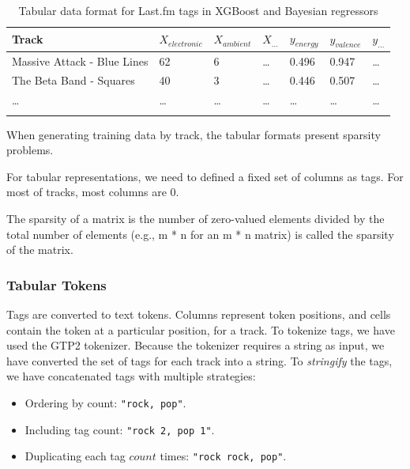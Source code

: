 \documentclass[sn-mathphys]{sn-jnl}%
\theoremstyle{thmstyleone}%
\theoremstyle{thmstyletwo}%
\theoremstyle{thmstylethree}%
\begin{document}
\begin{table}[h]
      \begin{center}
      \begin{minipage}{\textwidth}
      \caption{Tabular data format for Last.fm tags in XGBoost and Bayesian regressors}\label{tabular_tags_format}%
      \begin{tabular}{@{}lllllll@{}}
      \toprule
      Track                         & $X_{electronic}$ & $X_{ambient}$ & $X_{\dots}$ & $y_{energy}$ & $y_{valence}$ & $y_{\dots}$ \\
      \midrule
      Massive Attack - Blue Lines   & 62               & 6             &  \dots      & 0.496        & 0.947         & \dots  \\
      The Beta Band - Squares       & 40               & 3             &  \dots      & 0.446        & 0.507         & \dots  \\
      \dots                         & \dots            & \dots         &  \dots      & \dots        & \dots         & \dots  \\
      \botrule
      \end{tabular}
      \end{minipage}
      \end{center}
\end{table}

When generating training data by track, the tabular formats present sparsity problems.

For tabular representations, we need to defined a fixed set of columns as tags.
For most of tracks, most columns are 0.

The sparsity of a matrix is the number of zero-valued elements divided by the total number of elements
(e.g., m * n for an m * n matrix) is called the sparsity of the matrix.


\subsubsection{Tabular Tokens}

Tags are converted to text tokens. Columns represent token positions, and cells contain the token at a particular position, for a track.
To tokenize tags, we have used the GTP2 tokenizer.
Because the tokenizer requires a string as input, we have converted the set of tags for each track into a string.
To \emph{stringify} the tags, we have concatenated tags with multiple strategies:

\begin{itemize}
      \item Ordering by count: \verb|"rock, pop"|.
      \item Including tag count: \verb|"rock 2, pop 1"|.
      \item Duplicating each tag $count$ times: \verb|"rock rock, pop"|.
\end{itemize}
\end{document}

